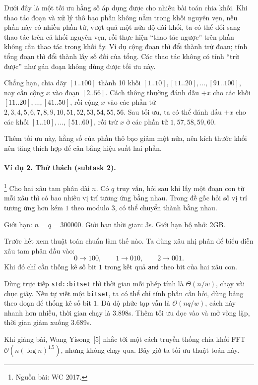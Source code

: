 \documentclass[11pt]{article}
\newcommand{\Oh}{\mathcal{O}}
\begin{document}
Dưới đây là một tối ưu hằng số áp dụng được cho nhiều bài toán chia khối. Khi
thao tác đoạn và xử lý thô bạo phần không nằm trong khối nguyên vẹn, nếu phần
này có nhiều phần tử, vượt quá một nửa độ dài khối, ta có thể đổi sang thao
tác trên cả khối nguyên vẹn, rồi thực hiện ``thao tác ngược'' trên phần không
cần thao tác trong khối ấy. Ví dụ cộng đoạn thì đổi thành trừ đoạn; tính tổng
đoạn thì đổi thành lấy số đối của tổng. Các thao tác không có tính ``trừ
được'' như gán đoạn không dùng được tối ưu này.

Chẳng hạn, chia dãy \([1..100]\) thành 10 khối
\([1..10],[11..20],\ldots,[91..100]\), nay cần cộng \(x\) vào đoạn
\([2..56]\). Cách thông thường đánh dấu \(+x\) cho các khối
\([11..20],\ldots,[41..50]\), rồi cộng \(x\) vào các phần tử
\(2,3,4,5,6,7,8,9,10,51,52,53,54,55,56\). Sau tối ưu, ta có thể đánh dấu
\(+x\) cho các khối \([1..10],\ldots,[51..60]\), rồi trừ \(x\) ở các phần tử
\(1,57,58,59,60\).

Thêm tối ưu này, hằng số của phần thô bạo giảm một nửa, nên kích thước khối
nên tăng thích hợp để cân bằng hiệu suất hai phần.

\paragraph{Ví dụ 2. Thử thách (subtask 2).}
\footnote{Nguồn bài: WC 2017.}
Cho hai xâu tam phân dài \(n\). Có \(q\) truy vấn, hỏi sau khi lấy một đoạn
con từ mỗi xâu thì có bao nhiêu vị trí tương ứng bằng nhau. Trong đề gốc hỏi
số vị trí tương ứng hơn kém \(1\) theo modulo \(3\), có thể chuyển thành bằng
nhau.

Giới hạn: \(n=q=300000\). Giới hạn thời gian: 3s. Giới hạn bộ nhớ: 2GB.

Trước hết xem thuật toán chuẩn làm thế nào. Ta dùng xâu nhị phân để biểu diễn
xâu tam phân đầu vào:
\[
  0\to 100,\qquad 1\to 010,\qquad 2\to 001.
\]
Khi đó chỉ cần thống kê số bit \(1\) trong kết quả \texttt{and} theo bit của
hai xâu con.

Dùng trực tiếp \texttt{std::bitset} thì thời gian mỗi phép tính là
\(\Theta(n/w)\), chạy vài chục giây. Nếu tự viết một \texttt{bitset}, ta có
thể chỉ tính phần cần hỏi, dùng bảng theo đoạn để thống kê số bit \(1\). Dù
độ phức tạp vẫn là \(\Oh(nq/w)\), cách này nhanh hơn nhiều, thời gian chạy là
3.898s. Thêm tối ưu đọc vào và mở vòng lặp, thời gian giảm xuống 3.689s.

Khi giảng bài, Wang Yisong~[5] nhắc tới một cách truyền thống chia khối FFT
\(\Oh(n(\log n)^{1.5})\), nhưng không chạy qua. Bây giờ ta tối ưu thuật toán
này.
\end{document}
